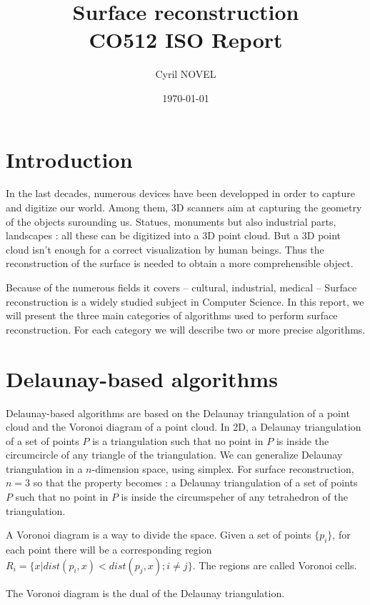\documentclass[a4paper]{article}
\title{Surface reconstruction\\
\large{CO512 ISO Report}}
\author{Cyril NOVEL}
\date{\today}
\begin{document}
\maketitle
\newpage

\tableofcontents

\newpage

\section*{Introduction}
In the last decades, numerous devices have been developped in order to capture and digitize our world. Among them, 3D scanners aim at capturing the geometry of the objects surounding us. Statues, monuments but also industrial parts, landscapes : all these can be digitized into a 3D point cloud. But a 3D point cloud isn't enough for a correct visualization by human beings. Thus the reconstruction of the surface is needed to obtain a more comprehensible object.

Because of the numerous fields it covers -- cultural, industrial, medical -- Surface reconstruction is a widely studied subject in Computer Science. In this report, we will present the three main categories of algorithms used to perform surface reconstruction. For each category we will describe two or more precise algorithms.

\newpage

\section{Delaunay-based algorithms}
Delaunay-based algorithms are based on the Delaunay triangulation of a point cloud and the Voronoi diagram of a point cloud. In 2D, a Delaunay triangulation of a set of points $P$ is a triangulation such that no point in $P$ is inside the circumcircle of any triangle of the triangulation. We can generalize Delaunay triangulation in a $n$-dimension space, using simplex. For surface reconstruction, $n = 3$ so that the property becomes : a Delaunay triangulation of a set of points $P$ such that no point in $P$ is inside the circumspeher of any tetrahedron of the triangulation.

A Voronoi diagram is a way to divide the space. Given a set of points $\{p_i\}$,  for each point there will be a corresponding region $R_i = \{x | dist(p_i,x) < dist(p_j,x) ; i \ne j\}$. The regions are called Voronoi cells.

The Voronoi diagram is the dual of the Delaunay triangulation.
\end{document}
